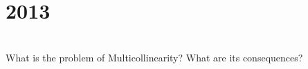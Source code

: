\section*{2013}
\vspace{-.5cm}
\hrulefill \smallskip\\
 What is the problem of Multicollinearity? What are its consequences?
